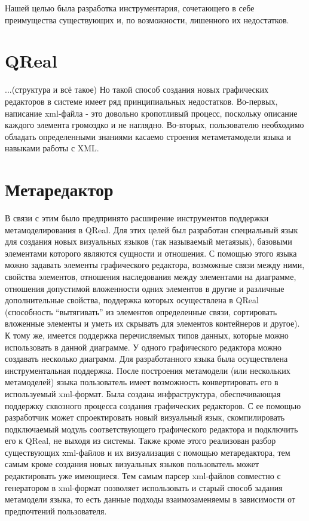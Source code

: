 \documentclass[a5paper]{article}
\begin{document}
Нашей целью была разработка инструментария, сочетающего в себе преимущества существующих и, по возможности, лишенного их недостатков.

\section*{QReal}
...(структура и всё	такое)
Но такой способ создания новых графических редакторов в системе имеет ряд принципиальных недостатков. Во-первых, написание xml-файла - это довольно кропотливый процесс, поскольку описание каждого элемента громоздко и не наглядно. Во-вторых, пользователю необходимо обладать определенными знаниями касаемо строения метаметамодели языка и навыками работы с XML.

\section*{Метаредактор}
В связи с этим было предпринято расширение инструментов поддержки метамоделирования в QReal. Для этих целей был разработан специальный язык для создания новых визуальных языков (так называемый метаязык), базовыми элементами которого являются сущности и отношения. С помощью этого языка можно задавать элементы графического редактора, возможные связи между ними, свойства элементов, отношения наследования между элементами на диаграмме, отношения допустимой вложенности одних элементов в другие и различные дополнительные свойства, поддержка которых осуществлена в QReal (способность “вытягивать” из элементов определенные связи, сортировать вложенные элементы и уметь их скрывать для элементов контейнеров и другое). К тому же, имеется поддержка перечисляемых типов данных, которые можно использовать в данной диаграмме. У одного графического редактора можно создавать несколько диаграмм. 
Для разработанного языка была осуществлена инструментальная поддержка. После построения метамодели (или нескольких метамоделей) языка пользователь имеет возможность конвертировать его в используемый xml-формат. Была создана инфраструктура, обеспечивающая поддержку сквозного процесса создания графических редакторов. С ее помощью разработчик может спроектировать новый визуальный язык, скомпилировать подключаемый модуль соответствующего графического редактора и подключить его к QReal, не выходя из системы. Также кроме этого реализован разбор существующих xml-файлов и их визуализация с помощью метаредактора, тем самым кроме создания новых визуальных языков пользователь может редактировать уже имеющиеся. Тем самым парсер xml-файлов совместно с генератором в xml-формат позволяет использовать и старый способ задания метамодели языка, то есть данные подходы взаимозаменяемы в зависимости от предпочтений пользователя.
\end{document}
